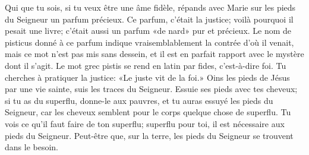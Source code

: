 Qui que tu sois, si tu veux être une âme fidèle,
	répands avec Marie sur les pieds du Seigneur un parfum précieux.
Ce parfum, c’était la justice; voilà pourquoi il pesait une livre;
	c’était aussi un parfum «de nard» pur et précieux.
Le nom de pisticus donné à ce parfum
	indique vraisemblablement la contrée d’où il venait,
	mais ce mot n’est pas mis sans dessein,
	et il est en parfait rapport avec le mystère dont il s’agit.
Le mot grec pistis se rend en latin par fides, c’est-à-dire foi.
	Tu cherches à pratiquer la justice: «Le juste vit de la foi.»
Oins les pieds de Jésus par une vie sainte, suis les traces du Seigneur.
Essuie ses pieds avec tes cheveux;
	si tu as du superflu, donne-le aux pauvres,
	et tu auras essuyé les pieds du Seigneur,
	car les cheveux semblent pour le corps quelque chose de superflu.
Tu vois ce qu’il faut faire de ton superflu;
	superflu pour toi, il est nécessaire aux pieds du Seigneur.
Peut-être que, sur la terre, les pieds du Seigneur se trouvent dans le besoin.

